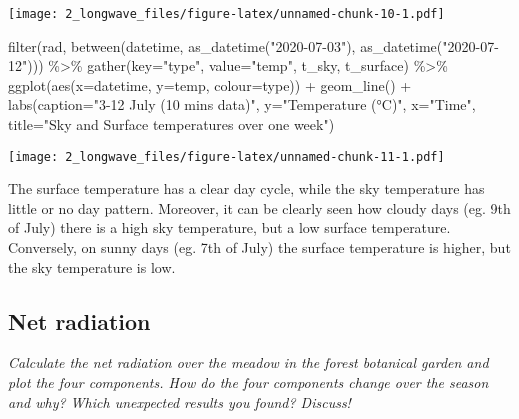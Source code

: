 \documentclass[
]{article}
\newenvironment{Shaded}{\begin{snugshade}}{\end{snugshade}}
\newcommand{\AttributeTok}[1]{\textcolor[rgb]{0.77,0.63,0.00}{#1}}
\newcommand{\FunctionTok}[1]{\textcolor[rgb]{0.00,0.00,0.00}{#1}}
\newcommand{\NormalTok}[1]{#1}
\newcommand{\SpecialCharTok}[1]{\textcolor[rgb]{0.00,0.00,0.00}{#1}}
\newcommand{\StringTok}[1]{\textcolor[rgb]{0.31,0.60,0.02}{#1}}
\begin{document}
\texttt{[image: 2\_longwave\_files/figure-latex/unnamed-chunk-10-1.pdf]}
\newpage

\begin{Shaded}
\begin{Highlighting}[]
\FunctionTok{filter}\NormalTok{(rad, }\FunctionTok{between}\NormalTok{(datetime, }\FunctionTok{as\_datetime}\NormalTok{(}\StringTok{"2020{-}07{-}03"}\NormalTok{), }\FunctionTok{as\_datetime}\NormalTok{(}\StringTok{"2020{-}07{-}12"}\NormalTok{))) }\SpecialCharTok{\%\textgreater{}\%}
  \FunctionTok{gather}\NormalTok{(}\AttributeTok{key=}\StringTok{"type"}\NormalTok{, }\AttributeTok{value=}\StringTok{"temp"}\NormalTok{, t\_sky, t\_surface) }\SpecialCharTok{\%\textgreater{}\%}
\FunctionTok{ggplot}\NormalTok{(}\FunctionTok{aes}\NormalTok{(}\AttributeTok{x=}\NormalTok{datetime, }\AttributeTok{y=}\NormalTok{temp, }\AttributeTok{colour=}\NormalTok{type)) }\SpecialCharTok{+}
  \FunctionTok{geom\_line}\NormalTok{()  }\SpecialCharTok{+}
  \FunctionTok{labs}\NormalTok{(}\AttributeTok{caption=}\StringTok{"3{-}12 July (10 mins data)"}\NormalTok{, }\AttributeTok{y=}\StringTok{"Temperature (°C)"}\NormalTok{, }\AttributeTok{x=}\StringTok{"Time"}\NormalTok{,}
       \AttributeTok{title=}\StringTok{"Sky and Surface temperatures over one week"}\NormalTok{)}
\end{Highlighting}
\end{Shaded}

\texttt{[image: 2\_longwave\_files/figure-latex/unnamed-chunk-11-1.pdf]}

The surface temperature has a clear day cycle, while the sky temperature
has little or no day pattern. Moreover, it can be clearly seen how
cloudy days (eg. 9th of July) there is a high sky temperature, but a low
surface temperature. Conversely, on sunny days (eg. 7th of July) the
surface temperature is higher, but the sky temperature is low.

\newpage

\hypertarget{net-radiation}{%
\subsection{Net radiation}\label{net-radiation}}

\emph{Calculate the net radiation over the meadow in the forest
botanical garden and plot the four components. How do the four
components change over the season and why? Which unexpected results you
found? Discuss!}
\end{document}
